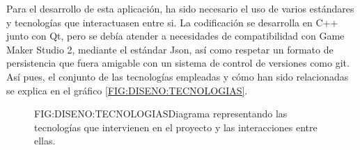 Para el desarrollo de esta aplicación, ha sido necesario el uso de varios estándares y tecnologías que interactuasen entre si. La codificación se desarrolla en C++ junto con Qt, pero se debía atender a necesidades de compatibilidad con Game Maker Studio 2, mediante el estándar Json, así como respetar un formato de persistencia que fuera amigable con un sistema de control de versiones como git.
Así pues, el conjunto de las tecnologías empleadas y cómo han sido relacionadas se explica en el gráfico \ref{FIG:DISENO:TECNOLOGIAS}.

\begin{figure}{FIG:DISENO:TECNOLOGIAS}{Diagrama representando las tecnologías que intervienen en el proyecto y las interacciones entre ellas.}
\end{figure}
